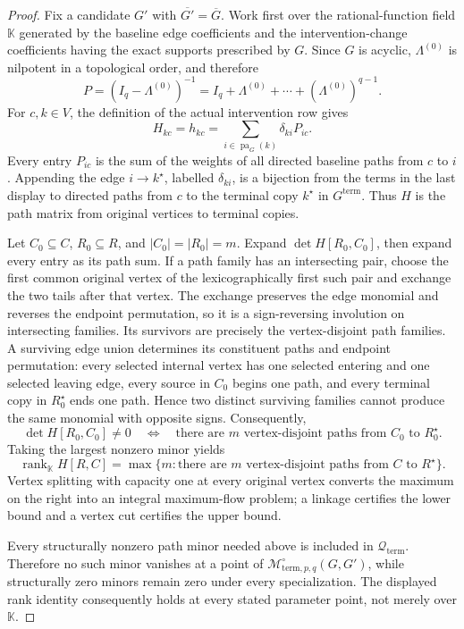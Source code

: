 \documentclass{article}
\begin{document}
\begin{proof}
Fix a candidate \(G'\) with \(\overline{G'}=\overline G\).  Work first over the rational-function field \(\mathbb K\) generated by the baseline edge coefficients and the intervention-change coefficients having the exact supports prescribed by \(G\).  Since \(G\) is acyclic, \(\Lambda^{(0)}\) is nilpotent in a topological order, and therefore
\[
 P=(I_q-\Lambda^{(0)})^{-1}
   =I_q+\Lambda^{(0)}+\cdots+(\Lambda^{(0)})^{q-1}.
\]
For \(c,k\in V\), the definition of the actual intervention row gives
\[
 H_{kc}=h_{kc}
 =\sum_{i\in\operatorname{pa}_{G}(k)}\delta_{ki}P_{ic}.
\]
Every entry \(P_{ic}\) is the sum of the weights of all directed baseline paths from \(c\) to \(i\).  Appending the edge \(i\to k^\star\), labelled \(\delta_{ki}\), is a bijection from the terms in the last display to directed paths from \(c\) to the terminal copy \(k^\star\) in \(G^{\mathrm{term}}\).  Thus \(H\) is the path matrix from original vertices to terminal copies.

Let \(C_0\subseteq C\), \(R_0\subseteq R\), and \(|C_0|=|R_0|=m\).  Expand \(\det H[R_0,C_0]\), then expand every entry as its path sum.  If a path family has an intersecting pair, choose the first common original vertex of the lexicographically first such pair and exchange the two tails after that vertex.  The exchange preserves the edge monomial and reverses the endpoint permutation, so it is a sign-reversing involution on intersecting families.  Its survivors are precisely the vertex-disjoint path families.  A surviving edge union determines its constituent paths and endpoint permutation: every selected internal vertex has one selected entering and one selected leaving edge, every source in \(C_0\) begins one path, and every terminal copy in \(R_0^\star\) ends one path.  Hence two distinct surviving families cannot produce the same monomial with opposite signs.  Consequently,
\[
 \det H[R_0,C_0]\ne0
 \quad\Longleftrightarrow\quad
 \text{there are \(m\) vertex-disjoint paths from \(C_0\) to \(R_0^\star\)}.
\]
Taking the largest nonzero minor yields
\[
 \operatorname{rank}_{\mathbb K}H[R,C]
 =\max\bigl\{m:\text{there are \(m\) vertex-disjoint paths from \(C\) to \(R^\star\)}\bigr\}.
\]
Vertex splitting with capacity one at every original vertex converts the maximum on the right into an integral maximum-flow problem; a linkage certifies the lower bound and a vertex cut certifies the upper bound.

Every structurally nonzero path minor needed above is included in \(\mathcal Q_{\mathrm{term}}\).  Therefore no such minor vanishes at a point of \(\mathcal M^{\circ}_{\mathrm{term},p,q}(G,G')\), while structurally zero minors remain zero under every specialization.  The displayed rank identity consequently holds at every stated parameter point, not merely over \(\mathbb K\).


\end{proof}
\end{document}
